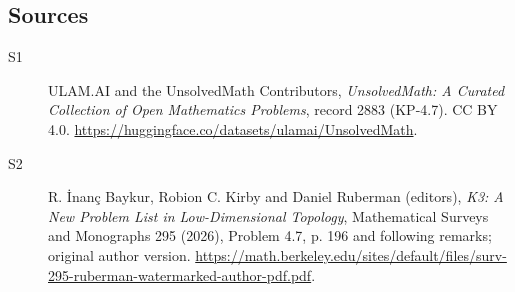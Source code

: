 \documentclass[11pt]{article}
\begin{document}
\subsection{Sources}
\begin{description}
\item[\hypertarget{source:2883:1}{S1}] ULAM.AI and the UnsolvedMath Contributors, \emph{UnsolvedMath: A Curated Collection of Open Mathematics Problems}, record 2883 (KP-4.7). CC BY 4.0. \url{https://huggingface.co/datasets/ulamai/UnsolvedMath}.
\item[\hypertarget{source:2883:2}{S2}] R. İnanç Baykur, Robion C. Kirby and Daniel Ruberman (editors), \emph{K3: A New Problem List in Low-Dimensional Topology}, Mathematical Surveys and Monographs 295 (2026), Problem 4.7, p. 196 and following remarks; original author version. \url{https://math.berkeley.edu/sites/default/files/surv-295-ruberman-watermarked-author-pdf.pdf}.
\end{description}
\label{end:2883}
\end{document}

